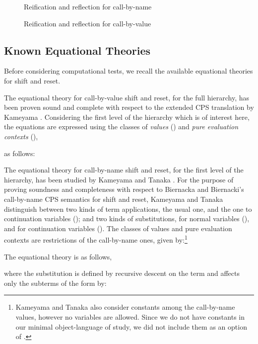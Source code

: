 \documentclass{eptcs}
\theoremstyle{definition}
\theoremstyle{plain}
\theoremstyle{remark}
\begin{document}
\begin{figure*}
\centering
  
  \caption{Reification and reflection for call-by-name}
  \label{fig:reifycbn}
\end{figure*}

\begin{figure*}
\centering
    
  \caption{Reification and reflection for call-by-value}
  \label{fig:reifycbv}
\end{figure*}


\subsection{Known Equational Theories}

Before considering computational tests, we recall the available equational theories for shift and reset. 

The equational theory for call-by-value shift and reset, for the full hierarchy, has been proven sound and complete with respect to the extended CPS translation \cite{DanvyF1990} by Kameyama \cite{Kameyama2007}. Considering the first level of the hierarchy which is of interest here, the equations are expressed using the classes of \emph{values} () and \emph{pure evaluation contexts} (),

as follows:


The equational theory for call-by-name shift and reset, for the first level of the hierarchy, has been studied by Kameyama and Tanaka \cite{KameyamaTanaka2010}. For the purpose of proving soundness and completeness with respect to Biernacka and Biernacki's \cite{BiernackaB2009} call-by-name CPS semantics for shift and reset, Kameyama and Tanaka distinguish between two kinds of term applications, the usual one, and the one to continuation variables (); and two kinds of substitutions, for normal variables (), and for continuation variables (). The classes of values and pure evaluation contexts are restrictions of the call-by-name ones, given by:\footnote{Kameyama and Tanaka also consider constants  among the call-by-name values, however no variables are allowed. Since we do not have constants in our minimal object-language of study, we did not include them as an option of .}

The equational theory is as follows,

where the substitution  is defined by recursive descent on the term  and affects only the subterms of the form  by:
\end{document}
